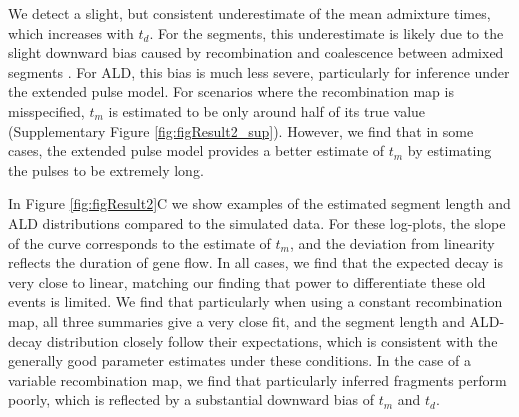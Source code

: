 \documentclass[11pt]{article}
\begin{document}
We detect a slight, but consistent underestimate of the mean admixture times, which increases with $t_d$. For the segments, this underestimate is likely due to the slight downward bias caused by recombination and coalescence between admixed segments \citep[][see also Appendix ]{liang_lengths_2014}. For ALD, this bias is much less severe, particularly for inference under the extended pulse model. For scenarios where the recombination map is misspecified,  $t_m$ is estimated to be only around half of its true value (Supplementary Figure \ref{fig:figResult2_sup}). However, we find that in some cases, the extended pulse model provides a better estimate of $t_m$ by estimating the pulses to be extremely long.

In Figure \ref{fig:figResult2}C we show examples of the estimated segment length and ALD distributions compared to the simulated data. For these log-plots, the slope of the curve corresponds to the estimate of $t_m$, and the deviation from linearity reflects the duration of gene flow. In all cases, we find that the expected decay is very close to linear, matching our finding that power to differentiate these old events is limited. We find that particularly when using a constant recombination map, all three summaries give a very close fit, and the segment length and ALD-decay distribution  closely follow their expectations, which is consistent with the generally  good parameter estimates under these conditions. In the case of a variable recombination map, we find that particularly inferred fragments perform poorly, which is reflected by a substantial downward bias of $t_m$ and $t_d$.
\end{document}

